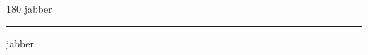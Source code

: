 
\begin{frame}
\begin{center}
\begin{turn}{180}
{\fontsize{2.5cm}{1em}\selectfont jabber}
\end{turn}
\vspace{1em}\par  
\hrule
\vspace{1em}\par  
{\fontsize{2.5cm}{1em}\selectfont jabber}
\end{center}
\end{frame}
